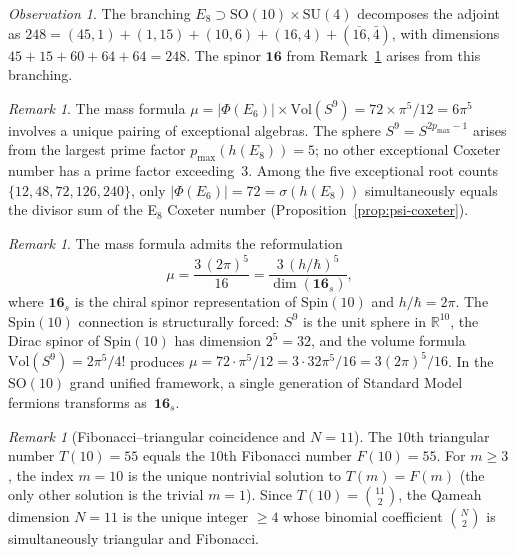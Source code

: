 \documentclass[11pt]{amsart}
\theoremstyle{plain}
\theoremstyle{definition}
\theoremstyle{remark}
\newtheorem{remark}[theorem]{Remark}
\newtheorem{observation}[theorem]{Observation}
\renewcommand{\Phi}{\varPhi}
\begin{document}
\begin{observation}\label{obs:E8-SO10-branching}
The branching $E_8 \supset \mathrm{SO}(10) \times \mathrm{SU}(4)$
decomposes the adjoint as
$248 = (45,1) + (1,15) + (10,6) + (16,4) + (\overline{16},\bar{4})$,
with dimensions $45 + 15 + 60 + 64 + 64 = 248$.
The spinor $\mathbf{16}$ from Remark~\ref{rem:spinor-reformulation}
arises from this branching.
\end{observation}

\begin{remark}\label{rem:E6-E8-uniqueness}
The mass formula $\mu = |\Phi(E_6)| \times \mathrm{Vol}(S^9) = 72
\times \pi^5/12 = 6\pi^5$ involves a unique pairing of exceptional
algebras.  The sphere $S^9 = S^{2p_{\max}-1}$ arises from the largest
prime factor $p_{\max}(h(E_8)) = 5$; no other exceptional Coxeter
number has a prime factor exceeding~$3$.  Among the five exceptional
root counts $\{12, 48, 72, 126, 240\}$, only $|\Phi(E_6)| = 72 = \sigma(h(E_8))$
simultaneously equals the divisor sum of the E$_8$ Coxeter number
(Proposition~\ref{prop:psi-coxeter}).
\end{remark}

\begin{remark}\label{rem:spinor-reformulation}
The mass formula admits the reformulation
\[
  \mu = \frac{3 \, (2\pi)^5}{16}
      = \frac{3 \, (h/\hbar)^5}{\dim(\mathbf{16}_s)},
\]
where $\mathbf{16}_s$ is the chiral spinor representation of
$\mathrm{Spin}(10)$ and $h/\hbar = 2\pi$.
The $\mathrm{Spin}(10)$ connection is structurally forced:
$S^9$ is the unit sphere in $\mathbb{R}^{10}$, the
Dirac spinor of $\mathrm{Spin}(10)$ has dimension
$2^5 = 32$, and the volume formula $\mathrm{Vol}(S^9) = 2\pi^5/4!$
produces $\mu = 72 \cdot \pi^5/12 = 3 \cdot 32\pi^5 / 16 = 3(2\pi)^5/16$.
In the $\mathrm{SO}(10)$ grand unified framework, a single generation
of Standard Model fermions transforms as~$\mathbf{16}_s$.
\end{remark}

\begin{remark}[Fibonacci--triangular coincidence and $N = 11$]%
\label{rem:fib-triangular}
The $10$th triangular number $T(10) = 55$ equals the $10$th Fibonacci
number $F(10) = 55$.  For $m \ge 3$, the index $m = 10$ is the unique
nontrivial solution to $T(m) = F(m)$
(the only other solution is the trivial $m = 1$).
Since $T(10) = \binom{11}{2}$, the Qameah dimension $N = 11$ is the
unique integer $\ge 4$ whose binomial coefficient $\binom{N}{2}$
is simultaneously triangular and Fibonacci.
\end{remark}
\end{document}
